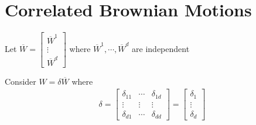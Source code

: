 \section{Correlated Brownian Motions}
Let $\overline{W} = \begin{bmatrix}\overline{W}^1\\\vdots\\\overline{W}^d\end{bmatrix}$ where $\overline{W}^1,\cdots,\overline{W}^d$ are independent
\par\bigskip
\noindent Consider $W = \delta\overline{W}$ where
\begin{equation*}
  \begin{gathered}
    \delta = \begin{bmatrix}\delta_{11}&\cdots&\delta_{1d}\\\vdots&\vdots&\vdots\\\delta_{d1}&\cdots&\delta_{dd}\end{bmatrix} = \begin{bmatrix}\delta_1\\\vdots\\\delta_d\end{bmatrix}
  \end{gathered}
\end{equation*}
